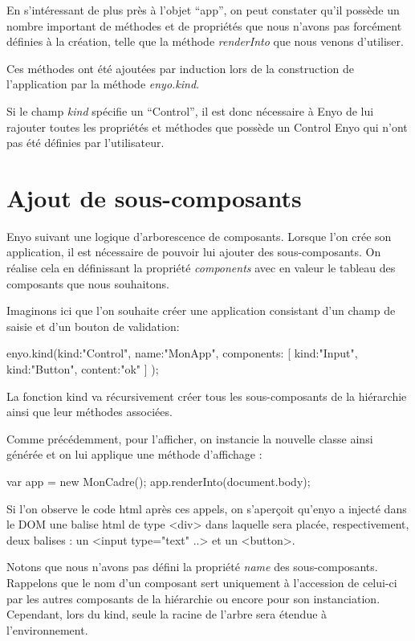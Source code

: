 \documentclass[11pt,a4paper]{report}
\begin{document}
En s'intéressant de plus près à l'objet ``app'', on peut constater qu'il
possède un nombre important de méthodes et de propriétés que nous n'avons 
pas forcément définies à la création, telle que la méthode \emph{renderInto}
que nous venons d'utiliser.

Ces méthodes ont été ajoutées par induction lors de la construction de 
l'application par la méthode \emph{enyo.kind}.

Si le champ \emph{kind} spécifie un ``Control'', il est donc nécessaire à Enyo de
lui rajouter toutes les propriétés et méthodes que possède un Control Enyo qui
n'ont pas été définies par l'utilisateur.

\section{Ajout de sous-composants}
Enyo suivant une logique d'arborescence de composants. Lorsque l'on crée 
son application, il est nécessaire de pouvoir lui ajouter des sous-composants. 
On réalise cela en définissant la propriété \emph{components} avec en valeur le tableau 
des composants que nous souhaitons.

Imaginons ici que l'on souhaite créer une application consistant d'un champ de saisie 
et d'un bouton de validation:
\begin{JavaScript}
 enyo.kind({kind:"Control",
            name:"MonApp",
            components: [
                         {kind:"Input"},
                         {kind:"Button", content:"ok"}
                        ]
           });
\end{JavaScript}

La fonction kind va récursivement créer tous les sous-composants de la hiérarchie 
ainsi que leur méthodes associées.

Comme précédemment, pour l'afficher, on instancie la nouvelle classe ainsi générée 
et on lui applique une méthode d'affichage : 

\begin{JavaScript}
  var app = new MonCadre();
  app.renderInto(document.body);
\end{JavaScript}

Si l'on observe le code html après ces appels, on s'aperçoit qu'enyo a injecté dans 
le DOM une balise html de type <div> dans laquelle sera placée, respectivement, 
deux balises : un <input type="text" ..> et un <button>.

\vbox{Notons que nous n'avons pas défini la propriété \emph{name} des sous-composants. 
Rappelons que le nom d'un composant sert uniquement à l'accession de celui-ci par les 
autres composants de la hiérarchie ou encore pour son instanciation. Cependant, lors du kind, 
seule la racine de l'arbre sera étendue à l'environnement.}
\end{document}
